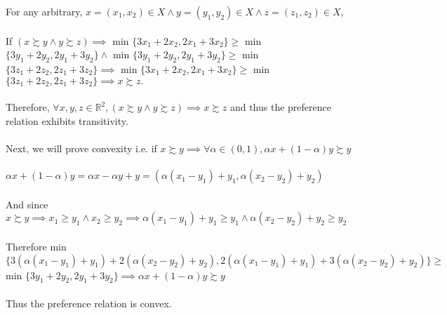 \documentclass[12pt]{article}
\newenvironment{problem}[2][Problem]{\begin{trivlist}
\item[\hskip \labelsep {\bfseries #1}\hskip \labelsep {\bfseries #2.}]}{\end{trivlist}}
\begin{document}
\begin{problem}{2}
For any arbitrary, $x = (x_1, x_2) \in X \land  y= (y_1, y_2) \in X \land z = (z_1, z_2) \in X$, 
\\
\\
If $ (x \succsim y \land y \succsim z) \implies $ min $\{3 x_1 + 2 x_2, 2 x_1 + 3 x_2\} \geq $ min $\{3 y_1 + 2 y_2, 2 y_1 + 3 y_2\} \land $  min $\{3 y_1 + 2 y_2, 2 y_1 + 3 y_2\} \geq $ min $\{3 z_1 + 2 z_2, 2 z_1 + 3 z_2\}\implies $  min $\{3 x_1 + 2 x_2, 2 x_1 + 3 x_2\} \geq $ min $\{3 z_1 + 2 z_2, 2 z_1 + 3 z_2\} \implies  x \succsim z.$
\\
\\
Therefore, $\forall x, y, z \in \mathbb{R}^{2}, (x \succsim y \land y \succsim z) \implies x \succsim z$ and thus the preference relation exhibits transitivity.
\\
\\
Next, we will prove convexity i.e. if $x \succsim y \implies \forall \alpha \in (0,1), \alpha x + (1-\alpha) y \succsim y $ 
\\
\\
$ \alpha x + (1-\alpha) y = \alpha x - \alpha y + y = (\alpha (x_1-y_1) + y_1, \alpha (x_2-y_2) + y_2)$
\\
\\
And since $x \succsim y \implies x_1 \geq y_1 \land x_2 \geq y_2 \implies \alpha (x_1-y_1) + y_1 \geq y_1 \land \alpha (x_2-y_2) + y_2 \geq y_2$ 
\\
\\
Therefore min$\{3(\alpha (x_1-y_1) + y_1) + 2( \alpha (x_2-y_2) + y_2), 2(\alpha (x_1-y_1) + y_1) + 3( \alpha (x_2-y_2) + y_2) \} \geq $ min $\{3 y_1 + 2 y_2, 2 y_1 + 3 y_2\} \implies \alpha x + (1-\alpha) y \succsim y$
\\
\\
Thus the preference relation is convex.
\end{problem}
\end{document}
